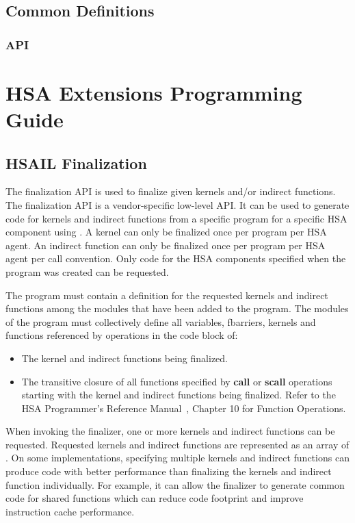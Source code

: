 \documentclass[final,oneside]{book}
\newcommand{\reffun}[1]{\textbf{#1}}
\newcommand{\refhsl}[1]{\reffun{#1}}
\begin{document}


\section{Common Definitions}\label{sec:other}
\subsection{API}

%


\chapter{HSA Extensions Programming Guide}

\section{HSAIL Finalization}\label{sec:finalizer}

The finalization API is used to finalize given kernels and/or indirect
functions.  The finalization API is a vendor-specific low-level API. It can be
used to generate code for kernels and indirect functions from a specific program
for a specific HSA component using . A kernel can only
be finalized once per program per HSA agent. An indirect function can only be
finalized once per program per HSA agent per call convention. Only code for the
HSA components specified when the program was created can be requested.

The program must contain a definition for the requested kernels and indirect
functions among the modules that have been added to the program. The modules
of the program must collectively define all variables, fbarriers, kernels and
functions referenced by operations in the code block of:
\begin{itemize}
\item{The kernel and indirect functions being finalized.}
\item{The transitive closure of all functions specified by \refhsl{call} or
    \refhsl{scall} operations starting with the kernel and indirect functions
    being finalized.  Refer to the HSA Programmer's Reference Manual~\cite{prm},
    Chapter 10 for Function Operations.}
\end{itemize}

When invoking the finalizer, one or more kernels and indirect functions can be
requested. Requested kernels and indirect functions are represented as an array
of . On some implementations, specifying
multiple kernels and indirect functions can produce code with better performance
than finalizing the kernels and indirect function individually. For example, it
can allow the finalizer to generate common code for shared functions which can
reduce code footprint and improve instruction cache performance.
\end{document}
